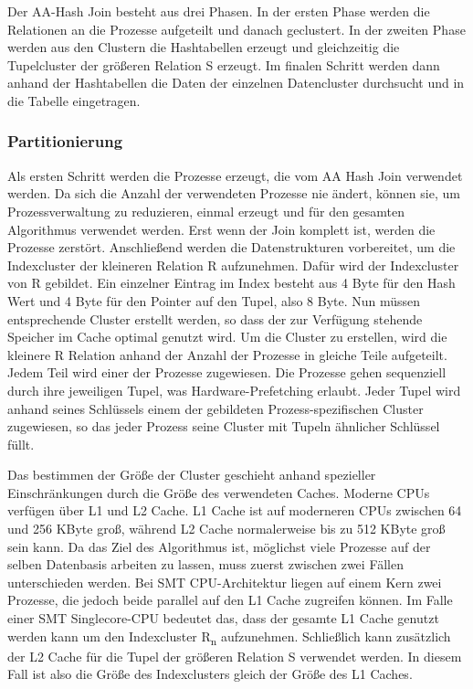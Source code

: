 Der AA-Hash Join besteht aus drei Phasen. In der ersten Phase werden die Relationen an die Prozesse aufgeteilt und danach geclustert. In der zweiten Phase werden aus den Clustern die Hashtabellen erzeugt und gleichzeitig die Tupelcluster der größeren Relation S erzeugt. Im finalen Schritt werden dann anhand der Hashtabellen die Daten der einzelnen Datencluster durchsucht und in die Tabelle eingetragen.

\subsubsection*{Partitionierung}
\label{sec:AA-Hash-Join_Partitionierung}

Als ersten Schritt werden die Prozesse erzeugt, die vom AA Hash Join verwendet werden. Da sich die Anzahl der verwendeten Prozesse nie ändert, können sie, um Prozessverwaltung zu reduzieren, einmal erzeugt und für den gesamten Algorithmus verwendet werden. Erst wenn der Join komplett ist, werden die Prozesse zerstört. Anschließend werden die Datenstrukturen vorbereitet, um die Indexcluster der kleineren Relation R aufzunehmen. Dafür wird der Indexcluster von R gebildet. Ein einzelner Eintrag im Index besteht aus 4 Byte für den Hash Wert und 4 Byte für den Pointer auf den Tupel, also 8 Byte. Nun müssen entsprechende Cluster erstellt werden, so dass der zur Verfügung stehende Speicher im Cache optimal genutzt wird. Um die Cluster zu erstellen, wird die kleinere R Relation anhand der Anzahl der Prozesse in gleiche Teile aufgeteilt. Jedem Teil wird einer der Prozesse zugewiesen. Die Prozesse gehen sequenziell durch ihre jeweiligen Tupel, was Hardware-Prefetching erlaubt. Jeder Tupel wird anhand seines Schlüssels einem der gebildeten Prozess-spezifischen Cluster zugewiesen, so das jeder Prozess seine Cluster mit Tupeln ähnlicher Schlüssel füllt.

Das bestimmen der Größe der Cluster geschieht anhand spezieller Einschränkungen durch die Größe des verwendeten Caches. Moderne CPUs verfügen über L1 und L2 Cache. L1 Cache ist auf moderneren CPUs zwischen 64 und 256 KByte groß, während L2 Cache normalerweise bis zu 512 KByte groß sein kann. Da das Ziel des Algorithmus ist, möglichst viele Prozesse auf der selben Datenbasis arbeiten zu lassen, muss zuerst zwischen zwei Fällen unterschieden werden. Bei SMT CPU-Architektur  liegen auf einem Kern zwei Prozesse, die jedoch beide parallel auf den L1 Cache zugreifen können. Im Falle einer SMT Singlecore-CPU bedeutet das, dass der gesamte L1 Cache genutzt werden kann um den Indexcluster R\textsubscript{n} aufzunehmen. Schließlich kann zusätzlich der L2 Cache für die Tupel der größeren Relation S verwendet werden. In diesem Fall ist also die Größe des Indexclusters gleich der Größe des L1 Caches.

